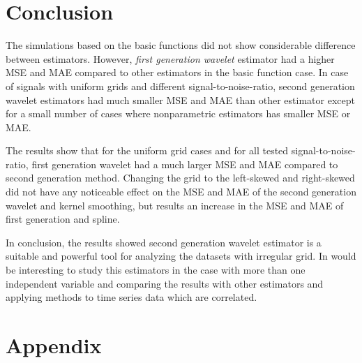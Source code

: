 \documentclass[12pt,twoside, a4paper]{reedthesis}
\begin{document}
\hypertarget{conclusion}{%
\chapter{Conclusion}\label{conclusion}}

The simulations based on the basic functions did not show considerable difference between estimators. However, \emph{first generation wavelet} estimator had a higher MSE and MAE compared to other estimators in the basic function case. In case of signals with uniform grids and different signal-to-noise-ratio, second generation wavelet estimators had much smaller MSE and MAE than other estimator except for a small number of cases where nonparametric estimators has smaller MSE or MAE.

The results show that for the uniform grid cases and for all tested signal-to-noise-ratio, first generation wavelet had a much larger MSE and MAE compared to second generation method. Changing the grid to the left-skewed and right-skewed did not have any noticeable effect on the MSE and MAE of the second generation wavelet and kernel smoothing, but results an increase in the MSE and MAE of first generation and spline.

In conclusion, the results showed second generation wavelet estimator is a suitable and powerful tool for analyzing the datasets with irregular grid. In would be interesting to study this estimators in the case with more than one independent variable and comparing the results with other estimators and applying methods to time series data which are correlated.

\appendix

\hypertarget{appendix}{%
\chapter{Appendix}\label{appendix}}
\end{document}
